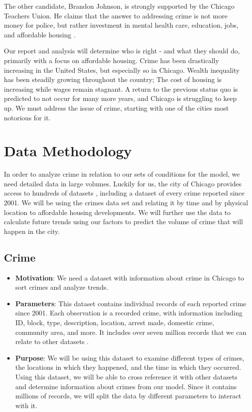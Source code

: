 \documentclass{article}
\begin{document}
\begin{onehalfspacing}
The other candidate, Brandon Johnson, is strongly supported by the Chicago Teachers Union. He claims that the answer to addressing crime is not more money for police, but rather investment in mental health care, education, jobs, and affordable housing \cite{burnett}.

Our report and analysis will determine who is right - and what they should do, primarily with a focus on affordable housing. Crime has been drastically increasing in the United States, but especially so in Chicago. Wealth inequality has been steadily growing throughout the country; The cost of housing is increasing while wages remain stagnant. A return to the previous status quo is predicted to not occur for many more years, and Chicago is struggling to keep up. We must address the issue of crime, starting with one of the cities most notorious for it.

\section{Data Methodology}
In order to analyze crime in relation to our sets of conditions for the model, we need detailed data in large volumes. Luckily for us, the city of Chicago provides access to hundreds of datasets \cite{data}, including a dataset of every crime reported since 2001. We will be using the crimes data set and relating it by time and by physical location to affordable housing developments. We will further use the data to calculate future trends using our factors to predict the volume of crime that will happen in the city.
\subsection{Crime}
\begin{itemize}
    \item \textbf{Motivation}: We need a dataset with information about crime in Chicago to sort crimes and analyze trends.
    \item \textbf{Parameters}: This dataset contains individual records of each reported crime since 2001. Each observation is a recorded crime, with information including ID, block, type, description, location, arrest made, domestic crime, community area, and more. It includes over seven million records that we can relate to other datasets \cite{crimes}.
    \item \textbf{Purpose}:  We will be using this dataset to examine different types of crimes, the locations in which they happened, and the time in which they occurred. Using this dataset, we will be able to cross reference it with other datasets and determine information about crimes from our model. Since it contains millions of records, we will split the data by different parameters to interact with it.
\end{itemize}


\end{onehalfspacing}
\end{document}
